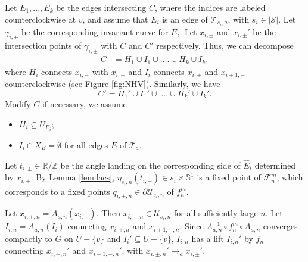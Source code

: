 \documentclass[11pt, reqno]{amsart}
\numberwithin{equation}{section}
\theoremstyle{plain}
\theoremstyle{theorem}
\theoremstyle{definition}
\newcommand{\R}{\mathbb{R}}
\newcommand{\Z}{\mathbb{Z}}
\newcommand{\T}{\mathcal{T}}
\newcommand{\bp}{\mathcal{F}}
\newcommand{\U}{\mathcal{U}}
\numberwithin{figure}{section}
\begin{document}
Let $E_1,..., E_k$ be the edges intersecting $C$, where the indices are labeled counterclockwise at $v$, and assume that $E_i$ is an edge of $\T_{s_i, a}$, with $s_i \in |\mathcal{S}|$.
Let $\gamma_{i, \pm}$ be the corresponding invariant curve for $E_i$.
Let $x_{i, \pm}$ and $x_{i, \pm}'$ be the intersection points of $\gamma_{i, \pm}$ with $C$ and $C'$ respectively.
Thus, we can decompose
\begin{align*}
C &= H_1 \cup I_1 \cup.... \cup H_k \cup I_k,
\end{align*}
where $H_i$ connects $x_{i, -}$ with $x_{i, +}$ and $I_i$ connects $x_{i, +}$ and $x_{i+1, -}$ counterclockwise (see Figure \ref{fig:NHV}).
Similarly, we have 
$$
C'= H_1' \cup I_1' \cup.... \cup H_k' \cup I_k'.
$$
Modify $C$ if necessary, we assume 
\begin{itemize}
\item $H_i \subseteq U_{E_i}$;
\item $I_i \cap X_E = \emptyset$ for all edges $E$ of $\T_a$.
\end{itemize}

Let $t_{i, \pm} \in \R/\Z$ be the angle landing on the corresponding side of $\hat E_i$ determined by $x_{i, \pm}$.
By Lemma \ref{lem:lacs}, $\eta_{s_i,n}(t_{i, \pm}) \in s_i\times \mathbb{S}^1$ is a fixed point of $\bp_n^m$, which corresponds to a fixed points $q_{i, \pm, n} \in \partial \U_{s_i,n}$ of $f_n^m$.

Let $x_{i, \pm, n} = A_{a,n}(x_{i, \pm})$. 
Then $x_{i, \pm, n} \in \U_{s_i,n}$ for all sufficiently large $n$.
Let $I_{i, n} = A_{a,n}(I_i)$ connecting $x_{i, +, n} $ and $x_{i+1, -, n} $.
Since $A_{a,n}^{-1} \circ f_n^m \circ A_{a,n}$ converges compactly to $G$ on $U - \{v\}$ and $I_i' \subseteq U - \{v\}$, $I_{i,n}$ has a lift $I_{i,n}'$ by $f_n$ connecting $x_{i, +, n}'$ and $x_{i+1, -, n}'$, with $x_{i, \pm, n}'\to_a x_{i,\pm}'$.
\end{document}
